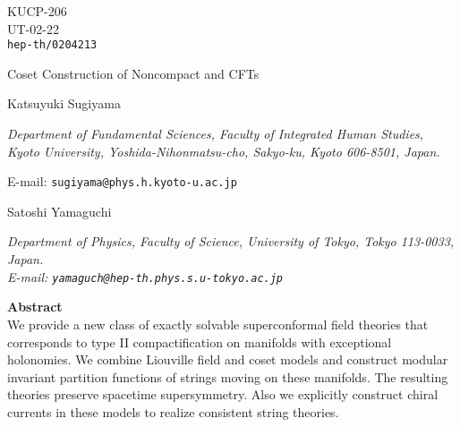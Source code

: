 \documentclass[a4paper,12pt]{article}
\numberwithin{equation}{section}
\providecommand{\Ncal}{{\cal N}}
\providecommand{\G}[1]{\mbox{\myHighlight{$G_{#1}$}\coordHE{}}}
\providecommand{\Spin}[1]{{\rm Spin}(#1)}
\begin{document}
\thispagestyle{empty}
\begin{flushright}
 \parbox{3.5cm}{KUCP-206\\ UT-02-22 \\
  {\tt hep-th/0204213}}
\end{flushright}

\vspace*{1cm}
\begin{center}
 {\Large
    Coset Construction of Noncompact \myHighlight{$\Spin7$}\coordHE{} and \G2 CFTs
 }
\end{center}

\vspace*{2cm} 
\begin{center}
 \noindent
 {\large Katsuyuki Sugiyama}

 \vspace{5mm}
 \noindent
 \hspace{0.7cm} \parbox{142mm}{\it
 Department of Fundamental Sciences, Faculty of Integrated Human Studies,
 Kyoto University, Yoshida-Nihonmatsu-cho,
 Sakyo-ku, Kyoto 606-8501, Japan.

 E-mail: {\tt sugiyama@phys.h.kyoto-u.ac.jp}
 }
\end{center}

 \vspace{5mm}
\begin{center}
 \noindent
 {\large Satoshi Yamaguchi}

 \vspace{5mm}
 \noindent
 \hspace{0.7cm} \parbox{142mm}{\it
 Department of Physics, Faculty of Science, University of Tokyo,
 Tokyo 113-0033, Japan.\\
 E-mail: {\tt yamaguch@hep-th.phys.s.u-tokyo.ac.jp}
}
\end{center}


\vspace{2cm}
\hfill{\bf Abstract\ \ }\hfill\ \\
We provide a new class of exactly solvable superconformal field theories 
that corresponds to type II compactification on manifolds with
exceptional holonomies. We combine \myHighlight{$\Ncal=1$}\coordHE{} Liouville field and \myHighlight{$\Ncal=1$}\coordHE{} 
coset models and construct modular invariant partition functions of
strings moving on these manifolds.
The resulting theories preserve spacetime
supersymmetry. Also we explicitly construct chiral currents 
in these models to realize consistent string theories.
\end{document}

